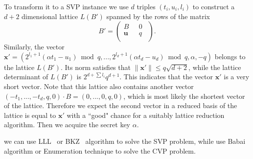 To transform it to a SVP instance we use $d$ triples $(t_i, u_i, l_i)$ to construct a $d+2$ dimensional lattice $L(B')$ spanned by the rows of the matrix
$$B' =
\left(
  \begin{array}{cc}
     B\ \  &\  0\ \  \\
    \textbf{u}\ \ &\ q \ \  \\
  \end{array}
\right).
$$
Similarly, the vector $\textbf{x}' = (2^{l_1+1}(\alpha t_1 - u_1) \bmod q, ..., 2^{l_d+1}(\alpha t_d - u_d) \bmod q, \alpha, -q)$ belongs to the lattice $L(B')$.
 Its norm satisfies that $\|\textbf{x}'\| \leq q\sqrt{d+2}$,
  while the lattice determinant of $L(B')$ is $2^{d + \sum{l_i}}q^{d+1}$.
   This indicates that the vector $\textbf{x}'$ is a very short vector.
Note that this lattice also contains another vector $(-t_1, ..., -t_d, q, 0)\cdot B = (0, ..., 0, q, 0)$,
 which is most likely the shortest vector of the lattice.
Therefore we expect the second vector in a reduced basis of the lattice is equal to $\textbf{x}'$ with a ``good" chance for a suitably lattice reduction algorithm.
Then we acquire the secret key $\alpha$.

we can use LLL~\cite{Lenstra1982} or BKZ~\cite{Schnorr1994} algorithm to solve the SVP problem, while use Babai~\cite{Babai1986} algorithm or Enumeration technique to solve the CVP problem.


























